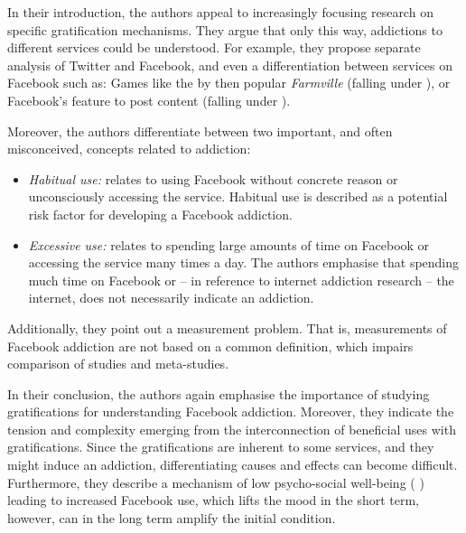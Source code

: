 In their introduction, the authors appeal to increasingly focusing research on specific gratification mechanisms.
They argue that only this way, addictions to different services could be understood. 
For example, they propose separate analysis of Twitter and Facebook, and even a differentiation between services on Facebook such as: Games like the by then popular \emph{Farmville} (falling under ), or Facebook's feature to post content (falling under ).

Moreover, the authors differentiate between two important, and often misconceived, concepts related to addiction:
\begin{itemize}
    \item \emph{Habitual use:} relates to using Facebook without concrete reason or unconsciously accessing the service. Habitual use is described as a potential risk factor for developing a Facebook addiction.
    \item \emph{Excessive use:} relates to spending large amounts of time on Facebook or accessing the service many times a day. The authors emphasise that spending much time on Facebook or -- in reference to internet addiction research -- the internet, does not necessarily indicate an addiction.
\end{itemize}
Additionally, they point out a measurement problem. That is, measurements of Facebook addiction are not based on a common definition, which impairs comparison of studies and meta-studies.

In their conclusion, the authors again emphasise the importance of studying gratifications for understanding Facebook addiction.
Moreover, they indicate the tension and complexity emerging from the interconnection of beneficial uses with gratifications.
Since the gratifications are inherent to some services, and they might induce an addiction, differentiating causes and effects can become difficult.
Furthermore, they describe a mechanism of low psycho-social well-being ( \citep{ryan_uses_2014}) leading to increased Facebook use, which lifts the mood in the short term, however, can in the long term amplify the initial condition.

